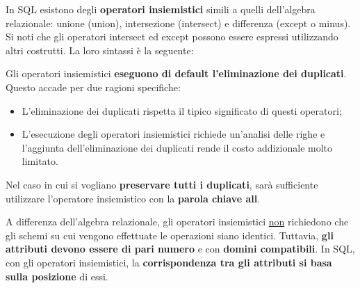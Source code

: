 \documentclass[a4paper]{article}
\begin{document}
	In SQL esistono degli \textbf{operatori insiemistici} simili a quelli dell'algebra relazionale: unione (\textcolor{Red3}{\textsf{union}}), intersezione (\textcolor{Red3}{\textsf{intersect}}) e differenza (\textcolor{Red3}{\textsf{except}} o \textcolor{Red3}{\textsf{minus}}). Si noti che gli operatori \textsf{intersect} ed \textsf{except} possono essere espressi utilizzando altri costrutti. La loro sintassi è la seguente:
	
	Gli operatori insiemistici \textbf{eseguono di default l'eliminazione dei duplicati}. Questo accade per due ragioni specifiche:
	\begin{itemize}
		\item L'eliminazione dei duplicati rispetta il tipico significato di questi operatori;
		
		\item L'esecuzione degli operatori insiemistici richiede un'analisi delle righe e l'aggiunta dell'eliminazione dei duplicati rende il costo addizionale molto limitato.
	\end{itemize}
	Nel caso in cui si vogliano \textbf{preservare tutti i duplicati}, sarà sufficiente utilizzare l'operatore insiemistico con la \textbf{parola chiave \textsf{all}}.\newline
	
	\noindent
	A differenza dell'algebra relazionale, gli operatori insiemistici \underline{non} richiedono che gli schemi su cui vengono effettuate le operazioni siano identici. Tuttavia, \textbf{gli attributi devono essere di pari numero} e con \textbf{domini compatibili}. In SQL, con gli operatori insiemistici, la \textbf{corrispondenza tra gli attributi si basa sulla posizione} di essi.\newline
	
\end{document}

